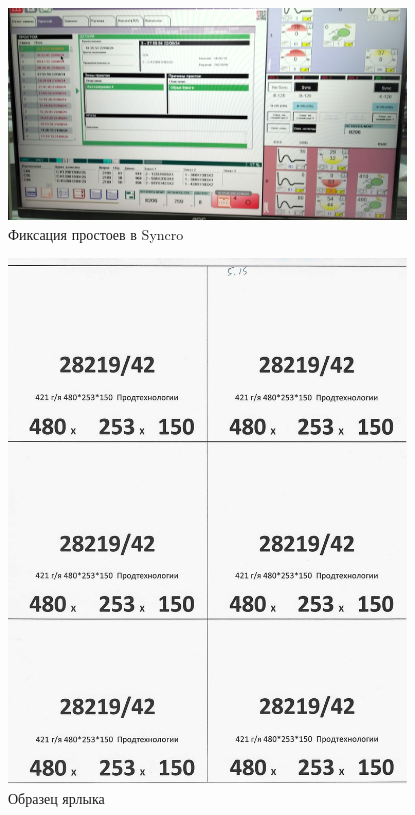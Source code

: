 \begin{figure}
\begin{center}
  \includegraphics[height=0.94\textheight, width=0.94\textwidth, keepaspectratio]{Pics 1/5 Простои в синхро.jpg }
\end{center}
  \caption{Фиксация простоев в Syncro}
  \label{pic:5 Простои в синхро}
\end{figure}

\begin{figure}
\begin{center}
  \includegraphics[height=0.94\textheight, width=0.94\textwidth, keepaspectratio]{Pics 1/5.15 ярлыки с ГА_0001.jpg}
\end{center}
  \caption{Образец ярлыка}
  \label{pic:5.15 ярлыки с ГА_0001}
\end{figure}

